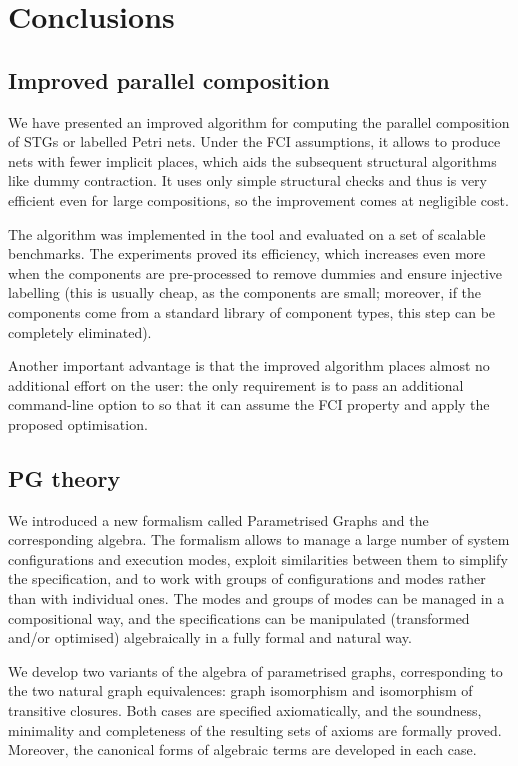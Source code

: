 \chapter{Conclusions\label{chap:Conclusion}}

\section{Improved parallel composition}

We have presented an improved algorithm for computing the
parallel composition of STGs or labelled Petri nets. Under the
FCI assumptions, it allows to produce nets with fewer implicit
places, which aids the subsequent structural algorithms like
dummy contraction. It uses only simple structural checks and
thus is very efficient even for large compositions, so the
improvement comes at negligible cost.

The algorithm was implemented in the \pcomp tool and evaluated
on a set of scalable benchmarks. The experiments proved its
efficiency, which increases even more when the components are
pre-processed to remove dummies and ensure injective labelling
(this is usually cheap, as the components are small; moreover,
if the components come from a standard library of component
types, this step can be completely eliminated).

Another important advantage is that the improved algorithm
places almost no additional effort on the user: the only
requirement is to pass an additional command-line option to
\pcomp so that it can assume the FCI property and apply the
proposed optimisation.

\section{PG theory}

We introduced a new formalism called Parametrised Graphs and the
corresponding algebra. The formalism allows to manage a large number
of system configurations and execution modes, exploit similarities
between them to simplify the specification, and to work with groups
of configurations and modes rather than with individual ones. The
modes and groups of modes can be managed in a compositional way, and
the specifications can be manipulated (transformed and/or optimised)
algebraically in a fully formal and natural way.

We develop two variants of the algebra of parametrised graphs, corresponding
to the two natural graph equivalences: graph isomorphism and isomorphism
of transitive closures. Both cases are specified axiomatically, and
the soundness, minimality and completeness of the resulting sets of
axioms are formally proved. Moreover, the canonical forms of algebraic
terms are developed in each case.

